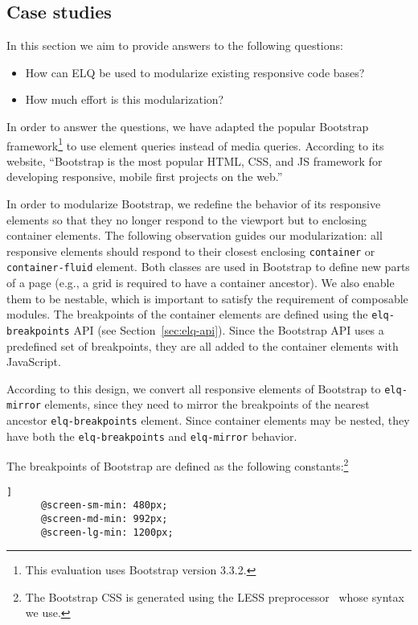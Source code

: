 \documentclass{acm_proc_article-sp}
\newcommand{\code}[1]{\texttt{#1}}
\newcommand{\elq}{ELQ}
\newcommand{\gls}[1]{#1}
\begin{document}
  \subsection{Case studies}
    In this section we aim to provide answers to the following questions:
    \begin{itemize}
      \item How can \elq{} be used to modularize existing responsive code bases?
      \item How much effort is this modularization?
    \end{itemize}

    In order to answer the questions, we have adapted the popular Bootstrap framework\footnote{This evaluation uses Bootstrap version 3.3.2.} to use element queries instead of media queries.
    According to its website, ``Bootstrap is the most popular HTML, CSS, and JS framework for developing responsive, mobile first projects on the web.''~\cite{bootstrap}
   
    In order to modularize Bootstrap, we redefine the behavior of its responsive elements so that they no longer respond to the viewport but to enclosing container elements.
    The following observation guides our modularization: all responsive elements should respond to their closest enclosing \code{container} or \code{container-fluid} element.
    Both classes are used in \gls{Bootstrap} to define new parts of a page (e.g., a grid is required to have a container ancestor).
    We also enable them to be nestable, which is important to satisfy the requirement of composable modules.
    The breakpoints of the container elements are defined using the \code{elq-breakpoints} API (see Section~\ref{sec:elq-api}).
    Since the Bootstrap API uses a predefined set of breakpoints, they are all added to the container elements with JavaScript.

    According to this design, we convert all responsive elements of Bootstrap to \code{elq-mirror} elements, since they need to mirror the breakpoints of the nearest ancestor \code{elq-breakpoints} element.
    Since container elements may be nested, they have both the \code{elq-breakpoints} and \code{elq-mirror} behavior.

    The breakpoints of Bootstrap are defined as the following constants:\footnote{The Bootstrap CSS is generated using the LESS preprocessor~\cite{lesscss} whose syntax we use.}
    \begin{lstlisting}[gobble=6,label={code:bootstrap-less-breakpoints},caption={},captionpos=b]]
      @screen-sm-min: 480px;
      @screen-md-min: 992px;
      @screen-lg-min: 1200px;
    \end{lstlisting}
\end{document}
